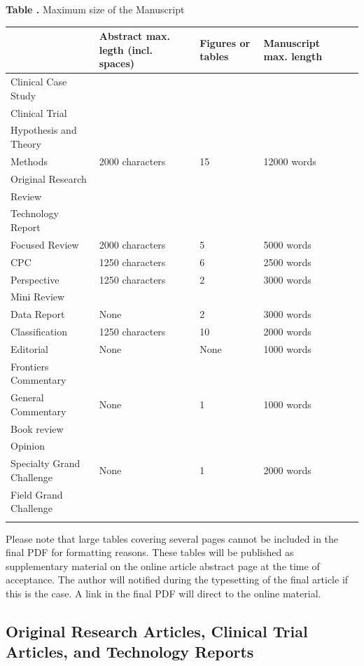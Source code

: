 \documentclass{frontiersSCNS} %
\begin{document}
\begin{table}[!t]
\textbf{\label{Tab:01} Table .}{ Maximum size of the Manuscript }

\processtable{ }
{\begin{tabular}{lllll}\toprule
 & Abstract max. legth (incl. spaces) & Figures or tables & Manuscript max. length \\\midrule
Clinical Case Study & & & &\\
Clinical Trial & & & &\\
Hypothesis and Theory & & & &\\
Methods & 2000 characters  & 15 & 12000 words \\
Original Research & & & &\\
Review & & & &\\
Technology Report & & & &\\\midrule
Focused Review & 2000 characters & 5 & 5000 words \\\midrule
CPC &  1250 characters& 6 & 2500 words  \\\midrule
Perspective & 1250 characters & 2 & 3000 words  \\
Mini Review & & & &\\\midrule
Data Report & None & 2 & 3000 words\\\midrule
Classification & 1250 characters & 10 & 2000 words \\\midrule
Editorial & None & None & 1000 words  \\\midrule
Frontiers Commentary  & & &\\
General Commentary & None & 1 & 1000 words\\
Book review & & & \\\midrule
Opinion   & & &\\
Specialty Grand Challenge & None & 1 & 2000 words\\
Field Grand Challenge & & & &\\\botrule
\end{tabular}}{}
\end{table}

Please note that large tables covering several pages cannot be included in the final PDF for formatting reasons. These tables will be published as supplementary material on the online article abstract page at the time of acceptance. The author will notified during the typesetting of the final article if this is the case. A link in the final PDF will direct to the online material.

\subsection{Original Research Articles, Clinical Trial Articles, and Technology Reports}
\end{document}
